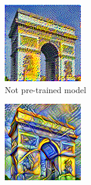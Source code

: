 \documentclass[twocolumn,superscriptaddress,aps,floatfix, nofootinbib]{revtex4-1}
\begin{document}
    \begin{figure}[ht]
        \centering
        \begin{subfigure}[b]{0.22\textwidth}
            \centering
            \includegraphics[width=\textwidth]{resources/png/model/sun-trees-paris-notpretrained.png}
            \caption{Not pre-trained model}
        \end{subfigure}
        \hfill
        \begin{subfigure}[b]{0.22\textwidth}
            \centering
            \includegraphics[width=\textwidth]{resources/png/model/sun-trees-paris-pretrained.png}

\end{subfigure}
\end{figure}
\end{document}
